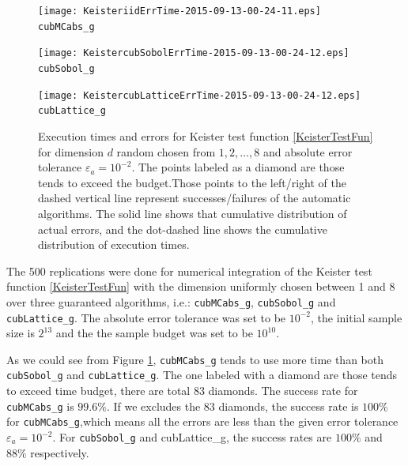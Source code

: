 \documentclass{iitthesis}
\theoremstyle{definition}
\begin{document}
\begin{figure}
\centering
\begin{minipage}{9cm} \centering \texttt{[image: KeisteriidErrTime-2015-09-13-00-24-11.eps]} \\ {\tt cubMCabs\_g} \end{minipage}
\begin{minipage}{7cm} \centering \texttt{[image: KeistercubSobolErrTime-2015-09-13-00-24-12.eps]} \\ {\tt cubSobol\_g} \end{minipage}
\begin{minipage}{7cm} \centering \texttt{[image: KeistercubLatticeErrTime-2015-09-13-00-24-12.eps]} \\ {\tt cubLattice\_g} \end{minipage}
\caption{Execution times and errors for Keister test function \eqref{KeisterTestFun} for dimension $d$ random chosen from $1, 2, \ldots, 8$ and absolute error tolerance $\varepsilon_a=10^{-2}$. The points labeled as a diamond are those tends to exceed the budget.Those points to the left/right of the dashed vertical line represent successes/failures of the automatic algorithms.  The solid line shows that cumulative distribution of actual errors, and the dot-dashed line shows the cumulative distribution of execution times. \label{fig:keistertestfunabstol}}
\end{figure}

The 500 replications were done for numerical integration of the Keister test function \eqref{KeisterTestFun} with the dimension uniformly chosen between 1 and 8 over three guaranteed algorithms, i.e.: {\tt cubMCabs\_g}, {\tt cubSobol\_g} and {\tt cubLattice\_g}. The absolute error tolerance was set to be $10^{-2}$, the initial sample size is $2^{13}$ and the the sample budget was set to be $10^{10}$.

As we could see from Figure \ref{fig:keistertestfunabstol}, {\tt cubMCabs\_g} tends to use more time than both {\tt cubSobol\_g} and {\tt cubLattice\_g}. The one labeled with a diamond are those tends to exceed time budget, there are total 83 diamonds. The success rate for {\tt cubMCabs\_g} is $99.6\%$. If we excludes the 83 diamonds, the success rate is $100\%$ for {\tt cubMCabs\_g},which means all the errors are less than the given error tolerance $\varepsilon_a = 10^{-2}$. For {\tt cubSobol\_g} and {cubLattice\_g}, the success rates are $100\%$ and $88\%$ respectively.
\end{document}
